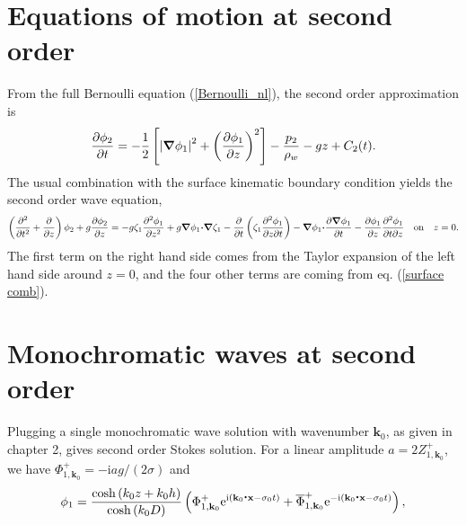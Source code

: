 \section{Equations of motion at second order}
From the full Bernoulli equation (\ref{Bernoulli_nl}), the second order approximation is 
 \begin{equation}
    \frac{\partial \phi_2}{\partial t} =
    -\frac{1}{2}\left[
    \left|\mbox{\boldmath $\nabla$} \phi_1\right|^2
    +\left(\frac{\partial \phi_1}{\partial z}\right)^2
    \right]
    -\frac{p_2}{\rho_w}-g z + C_2(t).\label{Bernoulli2}
\end{equation}
The usual combination with the surface kinematic boundary condition yields the second order wave equation,
\begin{equation}
\left(\frac{\partial ^{2}}{\partial t^{2}} +  \frac{\partial  }{\partial z} \right) \phi_2
    +g \frac{\partial \phi_2 }{\partial z}=- g \zeta_1 \frac{\partial^2 \phi_1 }{\partial z^2} + g \bnabla\phi_1 \bcdot\bnabla \zeta_1-\frac{\partial}{\partial
t} \left( \zeta_1 \frac{\partial^2 \phi_1}{\partial z \partial t}\right) -\bnabla \phi_1 \bcdot%
    \frac{\partial \bnabla \phi_1 }{\partial t}- \frac{\partial \phi_1 }{%
    \partial z}\frac{\partial ^{2}\phi_1 }{\partial t\partial z}\nonumber\\
    \quad \mathrm{on} \quad z=0 .  \label{surface_2b}
\end{equation}
The first term on the right hand side comes from the Taylor expansion of the left hand side around  $z=0$, 
and the four other terms are coming from eq. (\ref{surface comb}).




\section{Monochromatic waves at second order}
Plugging a single monochromatic wave solution with wavenumber ${\mathbf k}_0$, as given in chapter 2, gives 
second order Stokes solution. For a linear amplitude $a=2 Z_{1,{\mathbf k}_0}^{+}$, we have  $\Phi _{1,{\mathbf
k}_0}^+=-\mathrm{i}a g/\left(2\sigma\right)$ and
\begin{equation}
    \phi_1=\frac{\cosh\left(k_0 z+k_0 h\right)}{\cosh\left(k_0 D\right)}
    \left(\Phi _{1,{\mathbf k}_0}^+
    \mathrm{e}^{\mathrm{i}\left(\mathbf{k}_0\mbox{\boldmath $\cdot$}{\mathbf x}-\sigma_0 t\right)}
    +\overline{\Phi}_{1,{\mathbf k}_0}^+
\mathrm{e}^{-\mathrm{i}\left(\mathbf{k}_0\mbox{\boldmath $\cdot$}{\mathbf
x}-\sigma_0 t\right)}\right),
\end{equation}

